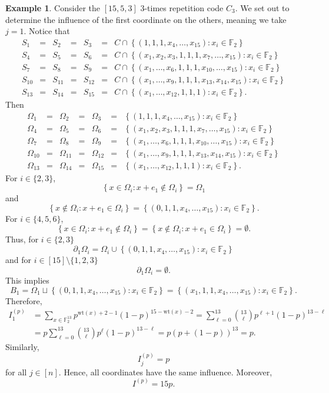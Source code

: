 \documentclass[12pt]{article}
\newcommand{\F}{\mathbb{F}}
\newcommand{\wt}{\mathrm{wt}}
\def\F{\mathbb F}
\theoremstyle{definition}
\newtheorem{example}[theorem]{Example}
\begin{document}
\begin{example} \label{rep_ex}
    Consider the $[15,5,3]$ $3$-times repetition code $C_3$. 
    We set out to determine the influence of the first coordinate on the others, meaning we take $j=1$.
    Notice that 
    $$
    \begin{array}{ccccccl}
    S_1&=&S_2&=&S_3&=&C \cap \left\{ (1, 1, 1, x_4, \dots, x_{15})\colon x_i \in \F_2\right\}\\
    S_4&=&S_5&=&S_6 & = & C \cap \left\{ (x_1, x_2, x_3, 1, 1, 1, x_7, \dots, x_{15})\colon x_i \in \F_2\right\}\\
S_7&=&S_8&=&S_9 & = & C \cap \left\{(x_1, \dots, x_6, 1, 1, 1, x_{10}, \dots, x_{15})\colon x_i \in \F_2\right\}\\
    S_{10}&=&S_{11}&=&S_{12} & = & C \cap \left\{(x_1, \dots, x_9, 1, 1, 1, x_{13}, x_{14}, x_{15})\colon x_i \in \F_2\right\}\\
     S_{13}&=&S_{14}&=&S_{15} & = & C \cap \left\{(x_1, \dots,  x_{12}, 1,1,1)\colon x_i \in \F_2\right\}.
     \end{array}
    $$
    Then  $$
    \begin{array}{ccccccl}
\Omega_1&=&\Omega_2&=&\Omega_3&=& \left\{ (1, 1, 1, x_4, \dots, x_{15})\colon x_i \in \F_2\right\}\\
\Omega_4&=&\Omega_5&=&\Omega_6 & = & \left\{ (x_1, x_2, x_3, 1, 1, 1, x_7, \dots, x_{15})\colon x_i \in \F_2\right\}\\
\Omega_7&=&\Omega_8&=&\Omega_9 & = &  \left\{(x_1, \dots, x_6, 1, 1, 1, x_{10}, \dots, x_{15})\colon x_i \in \F_2\right\}\\
 \Omega_{10}&=&\Omega_{11}&=&\Omega_{12} & = &  \left\{(x_1, \dots, x_9, 1, 1, 1, x_{13}, x_{14}, x_{15})\colon x_i \in \F_2\right\}\\
\Omega_{13}&=&\Omega_{14}&=&\Omega_{15} & = &  \left\{(x_1, \dots,  x_{12}, 1,1,1)\colon x_i \in \F_2\right\}.
     \end{array}
    $$
For $i \in \{ 2, 3\}$, 
$$\left\{ x \in \Omega_i\colon x+e_1 \notin \Omega_i \right\}=\Omega_1$$
and $$\left\{ x \notin \Omega_i\colon x+e_1 \in \Omega_i \right\}= \left\{ (0, 1, 1, x_4, \dots, x_{15})\colon x_i \in \F_2\right\}.$$For $i \in \{ 4, 5, 6 \}$, 
$$\left\{ x \in \Omega_i\colon x+e_1 \notin \Omega_i \right\}=\left\{ x \notin \Omega_i\colon x+e_1 \in \Omega_i \right\}=\emptyset. $$
Thus, for $i \in \{2, 3\}$
$$\partial_1 \Omega_i =
\Omega_i \cup \left\{ (0, 1, 1, x_4, \dots, x_{15})\colon x_i \in \F_2\right\}
$$
and for $i \in [15] \setminus \{ 1, 2, 3\}$
$$\partial_1 \Omega_i =\emptyset.
$$
This implies 
$$
B_1= \Omega_1 \sqcup \left\{ (0, 1, 1, x_4, \dots, x_{15})\colon x_i \in \F_2\right\}
=\left\{ (x_1, 1, 1, x_4, \dots, x_{15})\colon x_i \in \F_2\right\}.$$
Therefore, 
\begin{align*}
I_1^{(p)}&=\sum_{x \in \F_2^{13}} p^{\wt(x)+2-1}(1-p)^{15-\wt(x)-2}=\sum_{\ell =0}^{13} \binom{13}{\ell}p^{\ell + 1}(1-p)^{13-\ell}\\ 
&=p
\sum_{\ell =0}^{13} \binom{13}{\ell}p^{\ell }(1-p)^{13-\ell}=p(p+(1-p))^{13}=p.
\end{align*}
Similarly, $$I_j^{(p)}=p$$ for all $j\in [n]$. Hence, all coordinates have the same influence. 
Moreover, $$I^{(p)}=15p.$$


\end{example}
\end{document}
